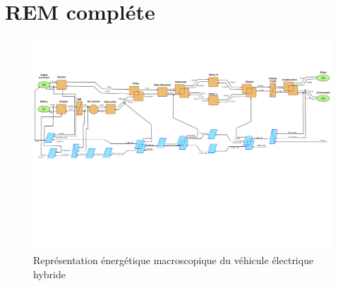 	\appendix
	\appendixpage
	\addappheadtotoc

\section{REM compléte}\FloatBarrier
\begin{figure}
\begin{center}
	\includegraphics[width=1.1\textwidth,angle=0]{images/REM.png}
	\caption{Représentation énergétique macroscopique du véhicule électrique hybride}\label{img:REM du VEH}
\end{center}
\end{figure} 
\FloatBarrier
